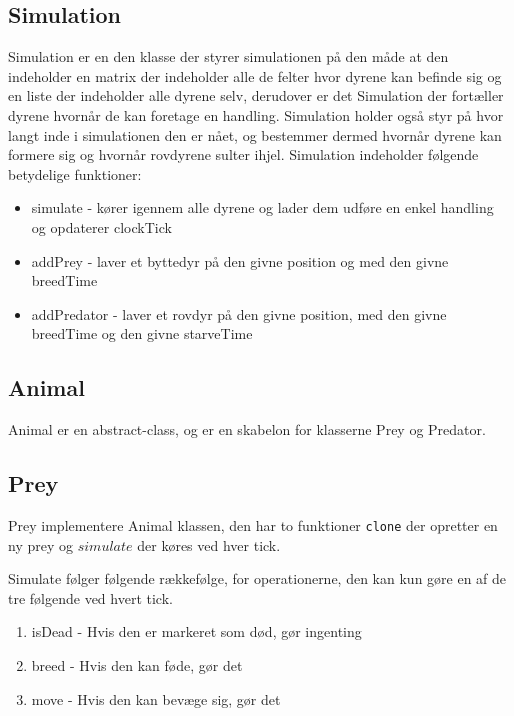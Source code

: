 \documentclass[a4paper]{article}
\begin{document}
    \subsection*{Simulation}
    Simulation er en den klasse der styrer simulationen på den måde at den indeholder en matrix der indeholder
    alle de felter hvor dyrene kan befinde sig og en liste der indeholder alle dyrene selv, derudover er det
    Simulation der fortæller dyrene hvornår de kan foretage en handling. Simulation holder også styr på hvor
    langt inde i simulationen den er nået, og bestemmer dermed hvornår dyrene kan formere sig og hvornår
    rovdyrene sulter ihjel. Simulation indeholder følgende betydelige funktioner:

    \begin{itemize}
      \item simulate - kører igennem alle dyrene og lader dem udføre en enkel handling og opdaterer clockTick
      \item addPrey - laver et byttedyr på den givne position og med den givne breedTime
      \item addPredator - laver et rovdyr på den givne position, med den givne breedTime og den givne starveTime
    \end{itemize}
    
    \subsection*{Animal}
      Animal er en abstract-class, og er en skabelon for klasserne Prey og 
      Predator. 
    
    \subsection*{Prey}
      Prey implementere Animal klassen,
      den har to funktioner \lstinline$clone$ der opretter en ny prey
      og $simulate$ der køres ved hver tick.

      Simulate følger følgende rækkefølge, for operationerne,
      den kan kun gøre en af de tre følgende ved hvert tick.

      \begin{enumerate}
        \item isDead - Hvis den er markeret som død, gør ingenting
        \item breed - Hvis den kan føde, gør det
        \item move - Hvis den kan bevæge sig, gør det
      \end{enumerate}
\end{document}

